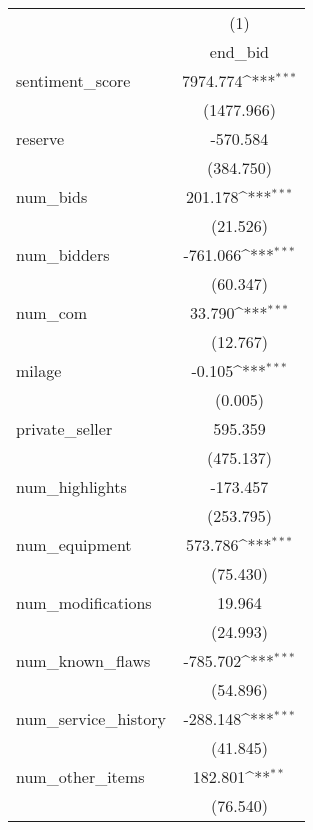 {
\def\sym#1{\ifmmode^{#1}\else\(^{#1}\)\fi}
\begin{tabular}{l*{1}{c}}
\hline\hline
                    &\multicolumn{1}{c}{(1)}\\
                    &\multicolumn{1}{c}{end\_bid}\\
\hline
sentiment\_score     &    7974.774\sym{***}\\
                    &  (1477.966)         \\
[1em]
reserve             &    -570.584         \\
                    &   (384.750)         \\
[1em]
num\_bids            &     201.178\sym{***}\\
                    &    (21.526)         \\
[1em]
num\_bidders         &    -761.066\sym{***}\\
                    &    (60.347)         \\
[1em]
num\_com             &      33.790\sym{***}\\
                    &    (12.767)         \\
[1em]
milage              &      -0.105\sym{***}\\
                    &     (0.005)         \\
[1em]
private\_seller      &     595.359         \\
                    &   (475.137)         \\
[1em]
num\_highlights      &    -173.457         \\
                    &   (253.795)         \\
[1em]
num\_equipment       &     573.786\sym{***}\\
                    &    (75.430)         \\
[1em]
num\_modifications   &      19.964         \\
                    &    (24.993)         \\
[1em]
num\_known\_flaws     &    -785.702\sym{***}\\
                    &    (54.896)         \\
[1em]
num\_service\_history &    -288.148\sym{***}\\
                    &    (41.845)         \\
[1em]
num\_other\_items     &     182.801\sym{**} \\
                    &    (76.540)         \\

\end{tabular}}
